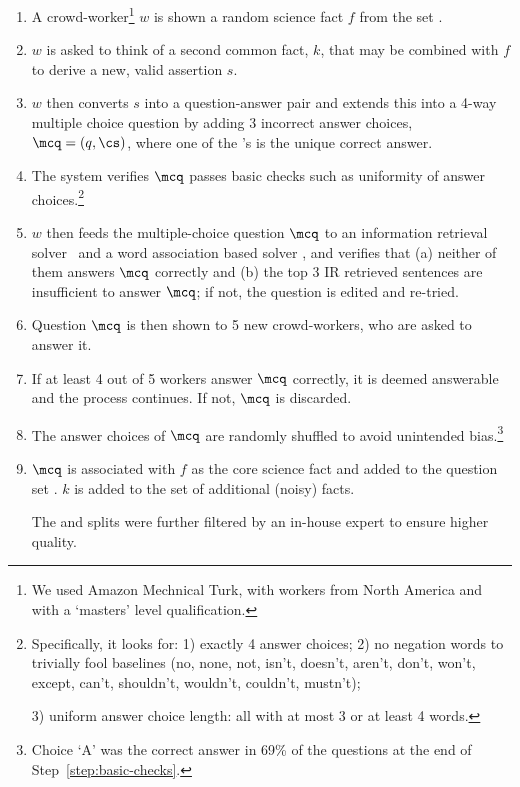\begin{enumerate}[wide, labelwidth=!, labelindent=4pt, itemsep=0pt]

\item A crowd-worker\footnote{\label{footnote:amt} We used Amazon Mechnical Turk, with workers from North America and with a `masters' level qualification.} $w$ is shown a random science fact $f$ from the set \Fs.

\item $w$ is asked to think of a second common fact, $k$, that may be combined with $f$ to derive a new, valid assertion $s$.

\item \label{step:creation} $w$ then converts $s$ into a question-answer pair and extends this into a 4-way multiple choice question by adding 3 incorrect answer choices, $\mcq = (q, \cs)$, where one of the \ci's is the unique correct answer.

\item \label{step:basic-checks} The system verifies $\mcq$ passes basic checks such as uniformity of answer choices.\footnote{Specifically, it looks for: 1) exactly 4 answer choices; 2) no negation words to trivially fool baselines (no, none, not, isn't, doesn't, aren't, don't, won't, except, can't, shouldn't, wouldn't, couldn't, mustn't);

3) uniform answer choice length: all with at most 3 or at least 4 words.}

\item $w$ then feeds the multiple-choice question $\mcq$ to an information retrieval solver~\cite{clark2016combining} and a word association based solver \cite{Turney2017LeveragingTB}, and verifies that (a) neither of them answers $\mcq$ correctly and (b) the top 3 IR retrieved sentences are insufficient to answer $\mcq$; if not, the question is edited and re-tried.

\item \label{step:answerability} Question $\mcq$ is then shown to 5 new crowd-workers, who are asked to answer it.

\item If at least 4 out of 5 workers answer $\mcq$ correctly, it is deemed answerable and the process continues. If not, $\mcq$ is discarded.

\item The answer choices of $\mcq$ are randomly shuffled to avoid unintended bias.\footnote{Choice `A' was the correct answer in 69\%  of the questions at the end of Step~\ref{step:basic-checks}.

}

\item $\mcq$ is associated with $f$ as the core science fact and added to the question set \Qs. $k$ is added to the set \Ks of additional (noisy) facts.

The \devname and \testname splits were further filtered by an in-house expert to ensure higher quality.

\end{enumerate}

